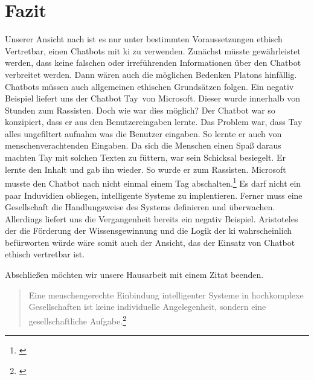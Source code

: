 \section{Fazit}
Unserer Ansicht nach ist es nur unter bestimmten Voraussetzungen ethisch Vertretbar, einen Chatbots mit \ac{ki} zu verwenden.\newline
Zunächst müsste gewährleistet werden, dass keine falschen oder irreführenden Informationen über den Chatbot verbreitet werden. Dann wären auch die möglichen Bedenken Platons hinfällig. \newline
Chatbots müssen auch allgemeinen ethischen Grundsätzen folgen. Ein negativ Beispiel liefert uns der Chatbot \glqq Tay\grqq\ von Microsoft. Dieser wurde innerhalb von Stunden zum Rassisten. Doch wie war dies möglich? Der Chatbot war so konzipiert, dass er aus den Benutzereingaben lernte. Das Problem war, dass Tay alles ungefiltert aufnahm was die Benutzer eingaben. So lernte er auch von menschenverachtenden Eingaben. Da sich die Menschen einen Spaß daraus machten Tay mit solchen Texten zu \glqq füttern\grqq, war sein Schicksal besiegelt. Er lernte den Inhalt und gab ihn wieder. So wurde er zum Rassisten. Microsoft musste den Chatbot nach nicht einmal einem Tag abschalten.\footnote{\cite{TaySpiegel}} \newline
Es darf nicht ein paar Induvidien obliegen, intelligente Systeme zu implentieren. Ferner muss eine Gesellschaft die Handlungsweise des Systems definieren und überwachen. Allerdings liefert uns die Vergangenheit bereits ein negativ Beispiel. \newline
Aristoteles der die Förderung der Wissensgewinnung und die Logik der \ac{ki} wahrscheinlich befürworten würde wäre somit auch der Ansicht, das der Einsatz von Chatbot ethisch vertretbar ist.

Abschließen möchten wir unsere Hausarbeit mit einem Zitat beenden. 
\begin{quote}
	 \glqq Eine menschengerechte Einbindung intelligenter Systeme in hochkomplexe Gesellschaften ist keine individuelle Angelegenheit, sondern eine gesellschaftliche Aufgabe.\grqq\footnote{\cite{BitkomZitat}}
\end{quote}

